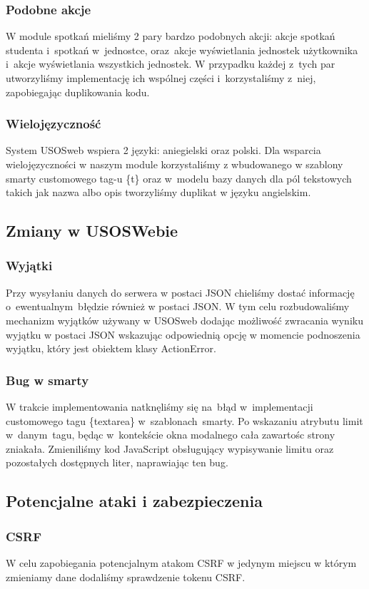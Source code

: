 \documentclass[licencjacka]{pracamgr}
\begin{document}
\subsubsection{Podobne akcje}
W module spotkań mieliśmy 2 pary bardzo podobnych akcji: akcje spotkań studenta i~spotkań w~jednostce, oraz~akcje wyświetlania jednostek użytkownika i~akcje wyświetlania wszystkich jednostek. W przypadku każdej z~tych par utworzyliśmy implementację ich wspólnej części i~korzystaliśmy z~niej, zapobiegając duplikowania kodu.
\subsubsection{Wielojęzyczność}
System USOSweb wspiera 2 języki: aniegielski oraz polski. Dla wsparcia wielojęzyczności w naszym module korzystaliśmy z wbudowanego w szablony smarty customowego tag-u \{t\} oraz w~modelu bazy danych dla pól tekstowych takich jak nazwa albo opis tworzyliśmy duplikat w języku angielskim.
\subsection{Zmiany w USOSWebie}
\subsubsection{Wyjątki}
Przy wysyłaniu danych do serwera w postaci JSON chieliśmy dostać informację o~ewentualnym~błędzie również w postaci JSON. W tym celu rozbudowaliśmy mechanizm wyjątków używany w USOSweb dodając możliwość zwracania wyniku wyjątku w postaci JSON wskazując odpowiednią opcję w momencie podnoszenia wyjątku, który jest obiektem klasy ActionError.
\subsubsection{Bug w smarty}
W trakcie implementowania natknęliśmy się na~błąd w~implementacji customowego tagu \{textarea\} w~szablonach~smarty. Po wskazaniu atrybutu limit w~danym~tagu, będąc w~kontekście okna modalnego cała zawartośc strony zniakała. Zmieniliśmy kod JavaScript obsługujący wypisywanie limitu oraz pozostałych dostępnych liter, naprawiając ten bug.
\subsection{Potencjalne ataki i zabezpieczenia} \label{subsec:bezpiecz}
\subsubsection{CSRF}
W celu zapobiegania potencjalnym atakom CSRF w jedynym miejscu w którym zmieniamy dane dodaliśmy sprawdzenie tokenu CSRF.
\end{document}
